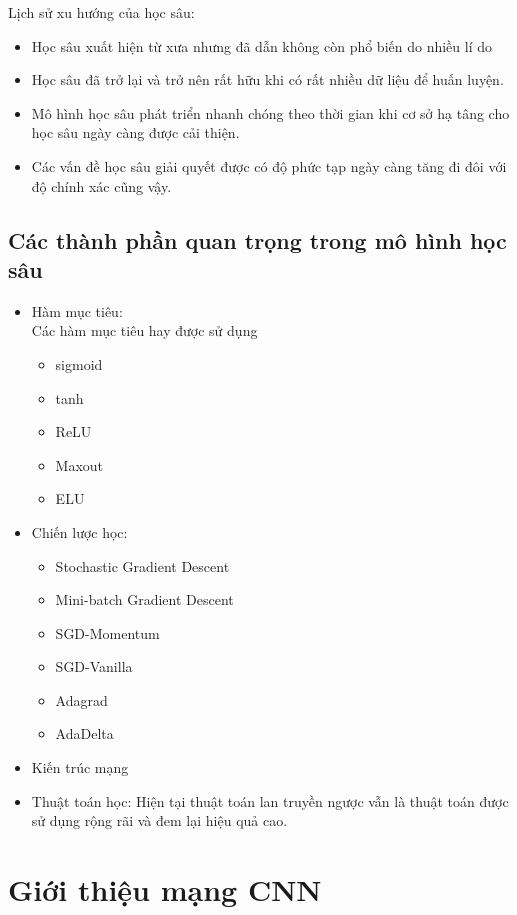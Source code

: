 \documentclass[a4paper,12pt]{report}
\begin{document}
Lịch sử xu hướng của học sâu:
\begin{itemize}
\item Học sâu xuất hiện từ xưa nhưng đã dẫn không còn phổ biến do nhiều lí do
\item Học sâu đã trở lại  và trở nên rất hữu khi có rất nhiều dữ liệu để huấn luyện.
\item Mô hình học sâu phát triển nhanh chóng theo thời gian khi cơ sở hạ tâng cho học sâu ngày càng được cải thiện. 
\item Các vấn đề học sâu giải quyết được có độ phức tạp ngày càng tăng đi đôi với độ chính xác cũng vậy.
\end{itemize}
\section{Các thành phần quan trọng trong mô hình học sâu}
\begin{itemize}
\item Hàm mục tiêu:\\ Các hàm mục tiêu hay được sử dụng \begin{itemize}
\item sigmoid
\item tanh
\item ReLU
\item Maxout
\item ELU
\end{itemize}
\item Chiến lược học: \begin{itemize}
\item Stochastic Gradient Descent
\item Mini-batch Gradient Descent
\item SGD-Momentum
\item SGD-Vanilla
\item Adagrad
\item AdaDelta
\end{itemize}
\item Kiến trúc mạng
\item Thuật toán học: Hiện tại thuật toán lan truyền ngược vẫn là thuật toán được sử dụng rộng rãi và đem lại hiệu quả cao.
\end{itemize}

\chapter{Giới thiệu mạng CNN}
\end{document}
